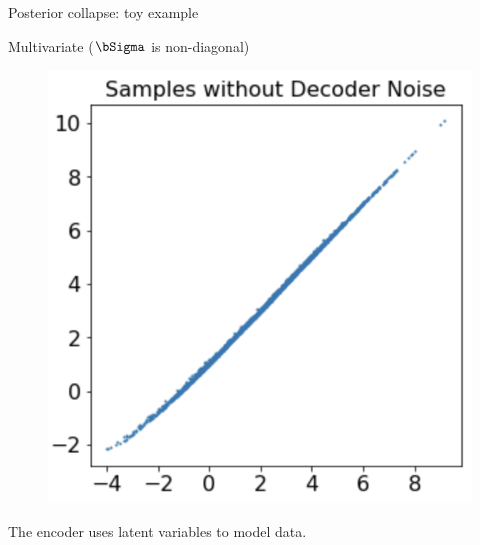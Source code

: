 \begin{frame}{Posterior collapse: toy example}
\begin{block}{Multivariate ($\bSigma$ is non-diagonal)}
\begin{minipage}[t]{0.33\columnwidth}
\begin{figure}[h]
			\end{figure}
		\end{minipage}%
		\begin{minipage}[t]{0.33\columnwidth}
			\begin{figure}[h]
				\centering
				\includegraphics[width=.75\linewidth]{figs/posterior_collapse_toy_5.png}
			\end{figure}
		\end{minipage}
		The encoder uses latent variables to model data.
	\end{block}
	

\end{frame}
